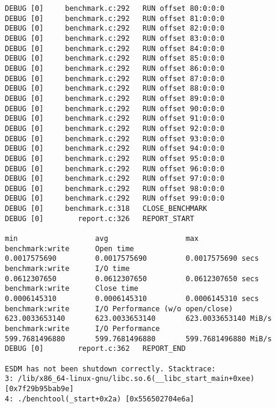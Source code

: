 \begin{verbatim}
DEBUG [0]     benchmark.c:292   RUN offset 80:0:0:0
DEBUG [0]     benchmark.c:292   RUN offset 81:0:0:0
DEBUG [0]     benchmark.c:292   RUN offset 82:0:0:0
DEBUG [0]     benchmark.c:292   RUN offset 83:0:0:0
DEBUG [0]     benchmark.c:292   RUN offset 84:0:0:0
DEBUG [0]     benchmark.c:292   RUN offset 85:0:0:0
DEBUG [0]     benchmark.c:292   RUN offset 86:0:0:0
DEBUG [0]     benchmark.c:292   RUN offset 87:0:0:0
DEBUG [0]     benchmark.c:292   RUN offset 88:0:0:0
DEBUG [0]     benchmark.c:292   RUN offset 89:0:0:0
DEBUG [0]     benchmark.c:292   RUN offset 90:0:0:0
DEBUG [0]     benchmark.c:292   RUN offset 91:0:0:0
DEBUG [0]     benchmark.c:292   RUN offset 92:0:0:0
DEBUG [0]     benchmark.c:292   RUN offset 93:0:0:0
DEBUG [0]     benchmark.c:292   RUN offset 94:0:0:0
DEBUG [0]     benchmark.c:292   RUN offset 95:0:0:0
DEBUG [0]     benchmark.c:292   RUN offset 96:0:0:0
DEBUG [0]     benchmark.c:292   RUN offset 97:0:0:0
DEBUG [0]     benchmark.c:292   RUN offset 98:0:0:0
DEBUG [0]     benchmark.c:292   RUN offset 99:0:0:0
DEBUG [0]     benchmark.c:318   CLOSE_BENCHMARK
DEBUG [0]        report.c:326   REPORT_START
                                                                               min                  avg                  max
benchmark:write      Open time                                        0.0017575690         0.0017575690         0.0017575690 secs
benchmark:write      I/O time                                         0.0612307650         0.0612307650         0.0612307650 secs
benchmark:write      Close time                                       0.0006145310         0.0006145310         0.0006145310 secs
benchmark:write      I/O Performance (w/o open/close)               623.0033653140       623.0033653140       623.0033653140 MiB/s
benchmark:write      I/O Performance                                599.7681496880       599.7681496880       599.7681496880 MiB/s
DEBUG [0]        report.c:362   REPORT_END

ESDM has not been shutdown correctly. Stacktrace:
3: /lib/x86_64-linux-gnu/libc.so.6(__libc_start_main+0xee) [0x7f29b95bab9e]
4: ./benchtool(_start+0x2a) [0x556502704e6a]
\end{verbatim}

